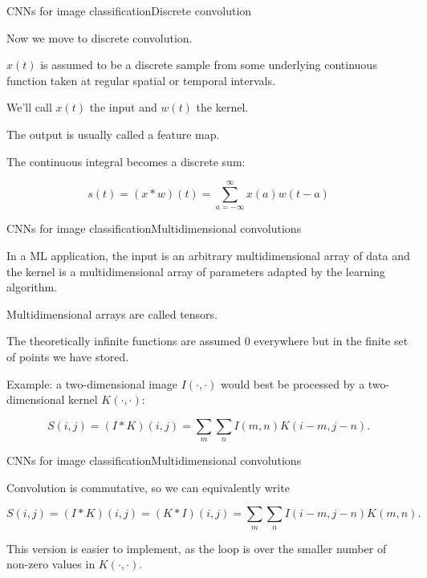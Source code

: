 \documentclass{beamer}
\begin{document}
\begin{frame}{CNNs for image classification}{Discrete convolution}

  Now we move to \alert{discrete} convolution.

  $x(t)$ is assumed to be a discrete sample from some underlying
  continuous function taken at regular spatial or temporal intervals.

  \medskip
  
  We'll call $x(t)$ the \alert{input} and $w(t)$ the \alert{kernel}.

  \medskip

  The output is usually called a \alert{feature map}.

  \medskip
  
  The continuous integral becomes a \alert{discrete sum}:

  $$ s(t) = (x * w)(t) = \sum_{a = -\infty}^{\infty} x(a) w(t-a) $$

\end{frame}


\begin{frame}{CNNs for image classification}{Multidimensional convolutions}

In a ML application, the input is an arbitrary \alert{multidimensional
  array of data} and the kernel is a \alert{multidimensional array of
  parameters} adapted by the learning algorithm.

\medskip

Multidimensional arrays are called \alert{tensors}.

\medskip

The theoretically infinite functions are assumed 0 everywhere but in
the finite set of points we have stored.

\medskip

Example: a two-dimensional image $I(\cdot,\cdot)$ would best be processed by a
two-dimensional kernel $K(\cdot,\cdot)$:

$$ S(i,j) = (I * K)(i, j) = \sum_m \sum_n I(m,n)K(i-m,j-n). $$

\end{frame}


\begin{frame}{CNNs for image classification}{Multidimensional convolutions}

Convolution is \alert{commutative}, so we can equivalently write

$$ S(i,j) = (I * K)(i,j) = (K * I)(i,j) =
\sum_m \sum_n I(i-m,j-n)K(m,n).$$

This version is easier to implement, as the loop is over the smaller
number of non-zero values in $K(\cdot,\cdot)$.

\end{frame}
\end{document}

